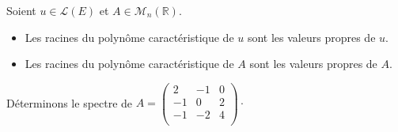 \documentclass[a4paper,10pt]{report}
\begin{document}
\medskip

\begin{prop} Soient $u \in \mathcal{L}(E)$ et $A \in \mathcal{M}_n(\mathbb{R})$.
\begin{itemize}
\item Les racines du polynôme caractéristique de $u$ sont les valeurs propres de $u$.
\item Les racines du polynôme caractéristique de $A$ sont les valeurs propres de $A$.
\end{itemize}
\end{prop}



\begin{ex} Déterminons le spectre de $A = \begin{pmatrix}
2 & -1 & 0 \\
-1 & 0 & 2 \\
-1 & -2 & 4 \\
\end{pmatrix} \cdot$
%

\vspace{6cm}
\end{ex}
\end{document}
